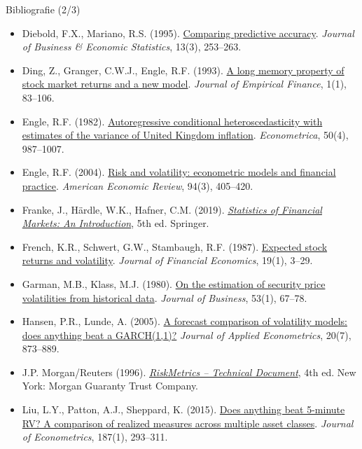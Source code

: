 \begin{frame}{Bibliografie (2/3)}
\itemsize{\tiny}
\begin{itemize}
    \item Diebold, F.X., Mariano, R.S. (1995). \href{https://doi.org/10.1080/07350015.1995.10524599}{Comparing predictive accuracy}. \textit{Journal of Business \& Economic Statistics}, 13(3), 253--263.
    \item Ding, Z., Granger, C.W.J., Engle, R.F. (1993). \href{https://doi.org/10.1016/0927-5398(93)90006-D}{A long memory property of stock market returns and a new model}. \textit{Journal of Empirical Finance}, 1(1), 83--106.
    \item Engle, R.F. (1982). \href{https://doi.org/10.2307/1912773}{Autoregressive conditional heteroscedasticity with estimates of the variance of United Kingdom inflation}. \textit{Econometrica}, 50(4), 987--1007.
    \item Engle, R.F. (2004). \href{https://doi.org/10.1257/0002828041464597}{Risk and volatility: econometric models and financial practice}. \textit{American Economic Review}, 94(3), 405--420.
    \item Franke, J., Härdle, W.K., Hafner, C.M. (2019). \href{https://doi.org/10.1007/978-3-030-13751-9}{\textit{Statistics of Financial Markets: An Introduction}}, 5th ed. Springer.
    \item French, K.R., Schwert, G.W., Stambaugh, R.F. (1987). \href{https://doi.org/10.1016/0304-405X(87)90026-2}{Expected stock returns and volatility}. \textit{Journal of Financial Economics}, 19(1), 3--29.
    \item Garman, M.B., Klass, M.J. (1980). \href{https://doi.org/10.1086/296072}{On the estimation of security price volatilities from historical data}. \textit{Journal of Business}, 53(1), 67--78.
    \item Hansen, P.R., Lunde, A. (2005). \href{https://doi.org/10.1002/jae.800}{A forecast comparison of volatility models: does anything beat a GARCH(1,1)?} \textit{Journal of Applied Econometrics}, 20(7), 873--889.
    \item J.P. Morgan/Reuters (1996). \href{https://www.msci.com/documents/10199/5915b101-4206-4ba0-aee2-3449d5c7e95a}{\textit{RiskMetrics -- Technical Document}}, 4th ed. New York: Morgan Guaranty Trust Company.
    \item Liu, L.Y., Patton, A.J., Sheppard, K. (2015). \href{https://doi.org/10.1016/j.jeconom.2015.02.008}{Does anything beat 5-minute RV? A comparison of realized measures across multiple asset classes}. \textit{Journal of Econometrics}, 187(1), 293--311.

\end{itemize}
\end{frame}

